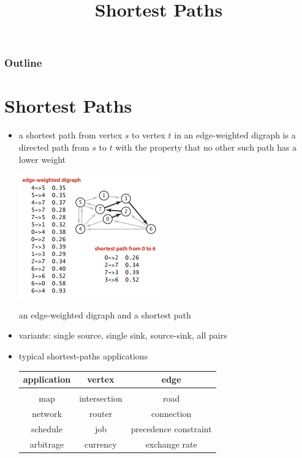 \documentclass[8pt,a4paper,compress]{beamer}
\title{Shortest Paths}
\date{}
\begin{document}
\begin{frame}
\vfill
\titlepage
\end{frame}

\begin{frame}
\frametitle{Outline}
\tableofcontents
\end{frame}

\section{Shortest Paths}
\begin{frame}[fragile]
\begin{itemize}
\item a shortest path from vertex $s$ to vertex $t$ in an edge-weighted digraph is a directed path from $s$ to $t$ with the property that no other such path has a lower weight

\begin{center}
\includegraphics[scale=0.4]{./figures/sp1.png}

\smallskip

\small an edge-weighted digraph and a shortest path
\end{center}

\item variants: single source, single sink, source-sink, all pairs

\item typical shortest-paths applications
\begin{center}
\begin{tabular}{ccc}
\textbf{application} & \textbf{vertex} & \textbf{edge} \\ \hline \\
map & intersection & road \\
network & router & connection \\
schedule & job & precedence constraint \\
arbitrage & currency & exchange rate
\end{tabular}
\end{center}
\end{itemize}
\end{frame}
\end{document}
